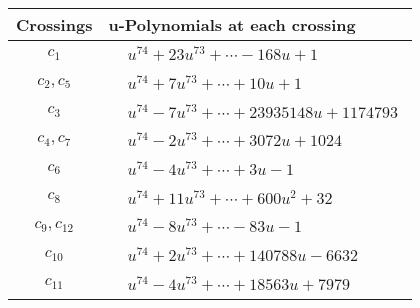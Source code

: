 \documentclass[1p]{elsarticle_modified}
\theoremstyle{definition}
\begin{document}
\begin{tabular}{m{50pt}|m{274pt}}
Crossings & \hspace{64pt}u-Polynomials at each crossing \\
\hline $$\begin{aligned}c_{1}\end{aligned}$$&$\begin{aligned}
&u^{74}+23 u^{73}+\cdots-168 u+1
\end{aligned}$\\
\hline $$\begin{aligned}c_{2},c_{5}\end{aligned}$$&$\begin{aligned}
&u^{74}+7 u^{73}+\cdots+10 u+1
\end{aligned}$\\
\hline $$\begin{aligned}c_{3}\end{aligned}$$&$\begin{aligned}
&u^{74}-7 u^{73}+\cdots+23935148 u+1174793
\end{aligned}$\\
\hline $$\begin{aligned}c_{4},c_{7}\end{aligned}$$&$\begin{aligned}
&u^{74}-2 u^{73}+\cdots+3072 u+1024
\end{aligned}$\\
\hline $$\begin{aligned}c_{6}\end{aligned}$$&$\begin{aligned}
&u^{74}-4 u^{73}+\cdots+3 u-1
\end{aligned}$\\
\hline $$\begin{aligned}c_{8}\end{aligned}$$&$\begin{aligned}
&u^{74}+11 u^{73}+\cdots+600 u^2+32
\end{aligned}$\\
\hline $$\begin{aligned}c_{9},c_{12}\end{aligned}$$&$\begin{aligned}
&u^{74}-8 u^{73}+\cdots-83 u-1
\end{aligned}$\\
\hline $$\begin{aligned}c_{10}\end{aligned}$$&$\begin{aligned}
&u^{74}+2 u^{73}+\cdots+140788 u-6632
\end{aligned}$\\
\hline $$\begin{aligned}c_{11}\end{aligned}$$&$\begin{aligned}
&u^{74}-4 u^{73}+\cdots+18563 u+7979
\end{aligned}$\\
\hline
\end{tabular}\\~\\
\end{document}
